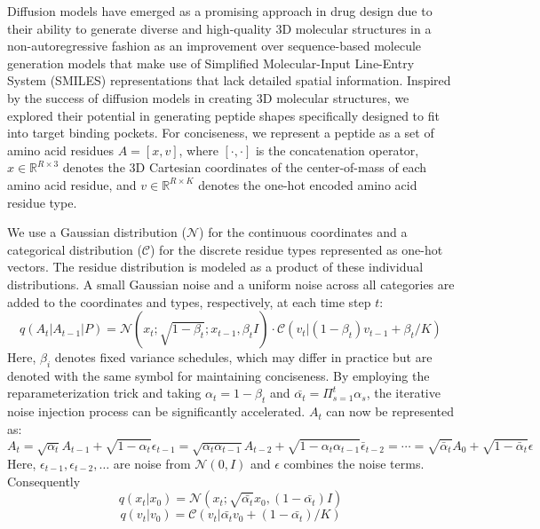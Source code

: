 \vspace{3pt} \noindent
Diffusion models have emerged as a promising approach in drug design due to their ability to generate diverse and high-quality 3D molecular structures in a non-autoregressive fashion \cite{du2022molgensurvey} as an improvement over sequence-based molecule generation models that make use of Simplified Molecular-Input Line-Entry System (SMILES) \cite{weininger1988smiles} representations that lack detailed spatial information. Inspired by the success of diffusion models in creating 3D molecular structures, we explored their potential in generating peptide shapes specifically designed to fit into target binding pockets. For conciseness, we represent a peptide as a set of amino acid residues $A = [x, v]$, where $[\cdot, \cdot]$ is the concatenation operator, $x \in \mathbb{R}^{R \times 3}$ denotes the 3D Cartesian coordinates of the center-of-mass of each amino acid residue, and $v \in \mathbb{R}^{R \times K}$ denotes the one-hot encoded amino acid residue type. 

\vspace{3pt} \noindent
We use a Gaussian distribution ($\mathcal{N}$) for the continuous coordinates and a categorical distribution ($\mathcal{C}$) for the discrete residue types represented as one-hot vectors. The residue distribution is modeled as a product of these individual distributions. A small Gaussian noise and a uniform noise across all categories are added to the coordinates and types, respectively, at each time step $t$:
$$q(A_t|A_{t-1}|P)=\mathcal{N}(x_t;\sqrt{1-\beta_t};x_{t-1},\beta_t I) \cdot \mathcal{C}(v_t|(1-\beta_t)v_{t-1}+\beta_t/K)$$
Here, $\beta_i$ denotes fixed variance schedules, which may differ in practice but are denoted with the same symbol for maintaining conciseness. By employing the reparameterization trick and taking $\alpha_t = 1 - \beta_t$ and $\bar{\alpha_t} = \Pi_{s=1}^t \alpha_s$, the iterative noise injection process can be significantly accelerated. $A_t$ can now be represented as:
$$A_t =\sqrt{\alpha_t}A_{t-1} + \sqrt{1-\alpha_t}\epsilon_{t-1}
= \sqrt{{\alpha_t}\alpha_{t-1}}A_{t-2} + \sqrt{1-\alpha_t\alpha_{t-1}}\bar{\epsilon}_{t-2} = \cdots = \sqrt{\bar{\alpha}_t}A_0 + \sqrt{1-\bar{\alpha}_t}\epsilon$$
Here, $\epsilon_{t-1}, \epsilon_{t-2}, \ldots$ are noise from $\mathcal{N}(0, I)$ and $\epsilon$ combines the noise terms. Consequently
$$q(x_t|x_0)=\mathcal{N}(x_t;\sqrt{\bar{\alpha_t}}x_0, (1-\bar{\alpha_t})I)$$
$$q(v_t|v_0)=\mathcal{C}(v_t|\bar{\alpha_t}v_0 + (1-\bar{\alpha_t})/K)$$

